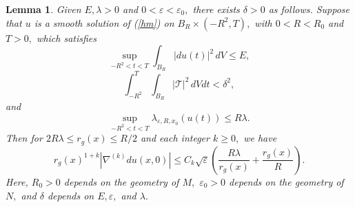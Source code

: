 \documentclass[12pt]{amsart}
\newcommand{\T}{{\mathcal T}}
\newtheorem{lemma}[thm]{Lemma}
\theoremstyle{others}
\numberwithin{equation}{section}
\newcommand{\eps}{\varepsilon}
\begin{document}
\begin{lemma}\label{basecase} Given $E, \lambda> 0$ and $0 < \eps < \eps_0,$ there exists $\delta > 0$ as follows. Suppose that $u$ is a smooth solution of (\ref{hm}) on $B_R \times ( - R^2, T),$ with $0 < R < R_0$ and $T > 0,$ which satisfies
\begin{equation}\label{basecase:energyassumption}
\sup_{-R^2<t<T} \int_{B_R} |du(t)|^2 \, dV \leq E,
\end{equation}
\begin{equation}\label{basecase:deltaassumption}
\int_{-R^2}^T \!\! \int_{B_R} |\T|^2 \, dV dt < \delta^2,
\end{equation}
and
\begin{equation}\label{basecase:lambdaassumption}
\sup_{-R^2<t<T} \lambda_{\eps, R, x_0}(u(t)) \leq R \lambda.
\end{equation}
Then for $2 R \lambda \leq r_g(x) \leq R/2$ and each integer $k \geq 0,$ we have
\begin{equation}\label{basecase:est}
r_g(x)^{1 + k} |\nabla^{(k)} du(x,0)| \leq C_k \sqrt{\eps} \left( \frac{R \lambda}{r_g(x)} + \frac{r_g(x)}{R} \right).
\end{equation}
Here, $R_0 > 0$ depends on the geometry of $M,$ $\eps_0 > 0$ depends on the geometry of $N,$ and $\delta$ depends on $E,\eps,$ and $\lambda.$
\end{lemma}
\end{document}
